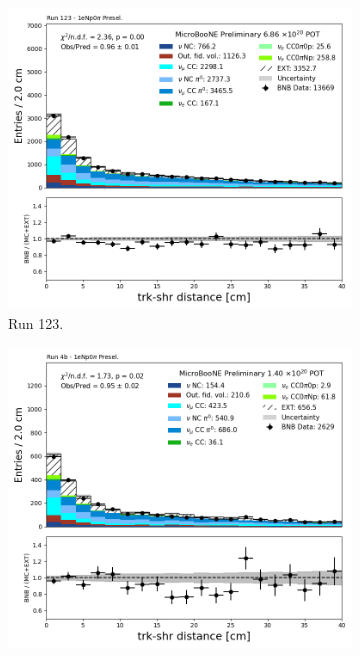 \begin{figure}[H]
    \centering
    \begin{subfigure}[t]{0.32\linewidth}
        \includegraphics[width=\linewidth]{technote/Appendix_Preselection/Figures/1eNp0pi/Run123/tksh_distance_Run123_1eNp0pi_Presel.png}
        \caption{Run 123.}
    \end{subfigure}%
    \hspace{0.2cm}%
    \begin{subfigure}[t]{0.32\linewidth}
        \includegraphics[width=\linewidth]{technote/Appendix_Preselection/Figures/1eNp0pi/Run4b/tksh_distance_Run4b_1eNp0pi_Presel.png}

\end{subfigure}
\end{figure}
